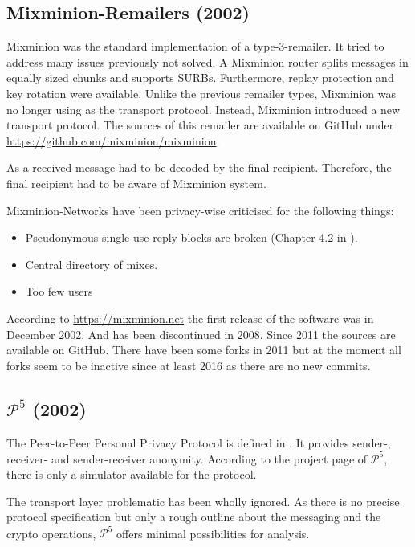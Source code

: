 \subsection{Mixminion-Remailers (2002)\label{sec:remMixminion}}
Mixminion was the standard implementation of a type-3-remailer. It tried to address many issues previously not solved. A Mixminion router splits messages in equally sized chunks and supports SURBs. Furthermore,  replay protection and key rotation were available. Unlike the previous remailer types, Mixminion was no longer using  as the transport protocol. Instead, Mixminion introduced a new transport protocol. The sources of this remailer are available on GitHub under \url{https://github.com/mixminion/mixminion}.

As a received message had to be decoded by the final recipient. Therefore, the final recipient had to be aware of Mixminion system.

Mixminion-Networks have been privacy-wise criticised for the following things: 
\begin{itemize}
	\item Pseudonymous single use reply blocks are broken (Chapter 4.2 in \cite{sassamanpynchon}).
	\item Central directory of mixes.
	\item Too few users
\end{itemize}

According to \url{https://mixminion.net} the first release of the software was in December 2002. And has been discontinued in 2008. Since 2011 the sources are available on GitHub. There have been some forks in 2011 but at the moment all forks seem to be inactive since at least 2016 as there are no new commits.

\subsection{\texorpdfstring{$\mathcal{P}^5$}{P5} (2002)}
The Peer-to-Peer Personal Privacy Protocol is defined in \cite{sherwood-protocol}. It provides sender-, receiver- and sender-receiver anonymity. According to the project page of $\mathcal{P}^5$, there is only a simulator available for the protocol.

The transport layer problematic has been wholly ignored. As there is no precise protocol specification but only a rough outline about the messaging and the crypto operations, $\mathcal{P}^5$ offers minimal possibilities for analysis.


